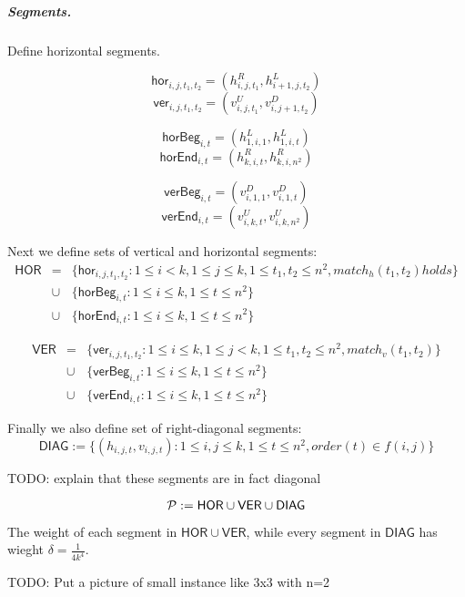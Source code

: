 \subparagraph{Segments.}
Define horizontal segments.

\newcommand{\hor}[4]{\mathsf{hor}_{#1,#2,#3,#4}}
\newcommand{\ver}[4]{\mathsf{ver}_{#1,#2,#3,#4}}
\newcommand{\horbeg}[2]{\mathsf{horBeg}_{#1,#2}}
\newcommand{\verbeg}[2]{\mathsf{verBeg}_{#1,#2}}
\newcommand{\horend}[2]{\mathsf{horEnd}_{#1,#2}}
\newcommand{\verend}[2]{\mathsf{verEnd}_{#1,#2}}

$$\hor{i}{j}{t_1}{t_2} = (h^R_{i,j,t_1}, h^L_{i+1, j, t_2})$$
$$\ver{i}{j}{t_1}{t_2} = (v^U_{i,j,t_1}, v^D_{i, j+1, t_2})$$

$$\horbeg{i}{t} = (h^L_{1, i, 1}, h^L_{1, i, t})$$
$$\horend{i}{t} = (h^R_{k, i, t}, h^R_{k, i, n^2})$$

$$\verbeg{i}{t} = (v^D_{i, 1, 1}, v^D_{i, 1, t})$$
$$\verend{i}{t} = (v^U_{i, k, t}, v^U_{i, k, n^2})$$

\newcommand{\allhor}{\mathsf{HOR}}
\newcommand{\allver}{\mathsf{VER}}
\newcommand{\alldiag}{\mathsf{DIAG}}

Next we define sets of vertical and horizontal segments:
\begin{eqnarray*}
\allhor &= &\{\hor{i}{j}{t_1}{t_2} : 1 \le i < k, 1 \le j \le k,
1 \le t_1, t_2 \le n^2, match_h(t_1, t_2) holds\} \\
&\cup &\{\horbeg{i}{t} : 1 \le i \le k, 1 \le t \le n^2\}
\\
&\cup &\{\horend{i}{t} : 1 \le i \le k, 1 \le t \le n^2\}
\end{eqnarray*}

\begin{eqnarray*}
\allver &= &\{\ver{i}{j}{t_1}{t_2} : 1 \le i \le k, 1 \le j < k,
1 \le t_1, t_2 \le n^2, match_v(t_1, t_2)\} \\
&\cup &\{\verbeg{i}{t} : 1 \le i \le k, 1 \le t \le n^2\}
\\
&\cup &\{\verend{i}{t} : 1 \le i \le k, 1 \le t \le n^2\}
\end{eqnarray*}

Finally we also define set of right-diagonal segments:
$$\alldiag := \{ (h_{i, j, t}, v_{i, j, t}) :
	1 \le i, j \le k, 1 \le t \le n^2, order(t) \in f(i, j)\}$$

TODO: explain that these segments are in fact diagonal

$$\sets := \allhor \cup \allver \cup \alldiag$$

The weight of each segment in $\allhor \cup \allver$,
while every segment in $\alldiag$ has wieght
$\delta = \frac{1}{4k^4}$.

TODO: Put a picture of small instance like 3x3 with n=2

